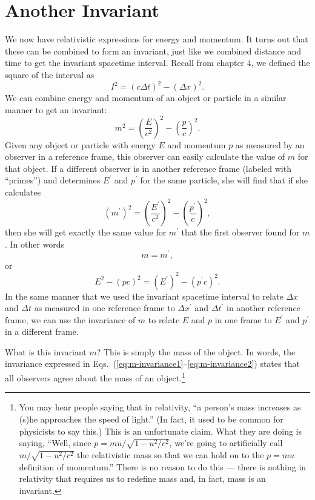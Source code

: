 \section{Another Invariant}

We now have relativistic expressions for energy and momentum.
It turns out that these can be combined to form an invariant, just
like we combined distance and time to get the invariant spacetime
interval.  Recall from chapter 4, we defined the square of the
interval as
\begin{equation}
I^2 = \left(c\Delta t\right)^2 - \left(\Delta x\right)^2.
\end{equation}
We can combine energy and momentum of an object or particle in a
similar manner to get an invariant:
\begin{equation}
m^2 = \left(\frac{E}{c^2}\right)^2 - \left(\frac{p}{c}\right)^2.
\label{eq:m-invariance1}
\end{equation}
Given any object or particle with energy $E$ and momentum $p$ as
measured by an observer in a reference frame, this observer can easily
calculate the value of $m$ for that object.  If a different observer is
in another reference frame (labeled with ``primes'') and determines 
$E^\prime$ and $p^\prime$ for the same particle, she will find that 
if she calculates
\begin{equation}
\left(m^\prime\right)^2 = \left(\frac{E^\prime}{c^2}\right)^2 
          - \left(\frac{p^\prime}{c}\right)^2,
\end{equation}
then she will get exactly the same value for $m^\prime$  that the first
observer found for $m$.  In other words
\begin{equation}
m=m^\prime,
\end{equation}
or
\begin{equation}
E^2 - (pc)^2 = \left(E^\prime\right)^2 - \left(p^\prime c\right)^2.
\label{eq:m-invariance2}
\end{equation}
In the same manner that we used the invariant spacetime interval to
relate $\Delta x$ and $\Delta t$ as measured in one reference frame to 
$\Delta x^\prime$ and $\Delta t^\prime$ in
another reference frame, we can use the invariance of $m$ to relate $E$
and $p$ in one frame to $E^\prime$ and $p^\prime$ in a different frame.

What is this invariant $m$?  This is simply the mass of the object.
In words, the invariance expressed in
Eqs.~(\ref{eq:m-invariance1}--\ref{eq:m-invariance2}) states that
all observers agree about the mass of an object.\footnote{You may hear
people saying that in relativity, ``a person's mass increases as (s)he
approaches the speed of light.''  (In fact, it used to be common for
physicists to say this.)  This is an unfortunate claim.  What they are
doing is saying, ``Well, since $p = mu/\sqrt{1-u^2/c^2}$, we're going
to artificially call $m/\sqrt{1-u^2/c^2}$ the relativistic mass so
that we can hold on to the $p=mu$ definition of momentum.''  There is
no reason to do this --- there is nothing in relativity that requires
us to redefine mass and, in fact, mass is an invariant.}

